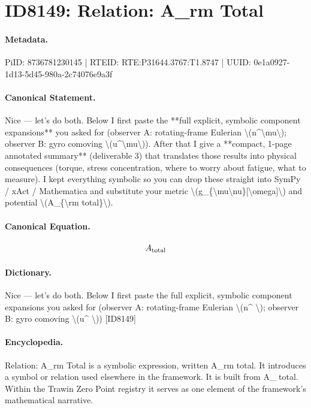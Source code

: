 \section*{ID8149: Relation: A\_rm Total}
\paragraph{Metadata.}
PiID: 8736781230145 | RTEID: RTE:P31644.3767:T1.8747 | UUID: 0e1a0927-1d13-5d45-980a-2c74076e9a3f

\paragraph{Canonical Statement.}
Nice — let’s do both. Below I first paste the **full explicit, symbolic component expansions** you asked for (observer A: rotating-frame Eulerian \textbackslash{}(n\textasciicircum{}\textbackslash{}mu\textbackslash{}); observer B: gyro comoving \textbackslash{}(u\textasciicircum{}\textbackslash{}mu\textbackslash{})). After that I give a **compact, 1-page annotated summary** (deliverable 3) that translates those results into physical consequences (torque, stress concentration, where to worry about fatigue, what to measure). I kept everything symbolic so you can drop these straight into SymPy / xAct / Mathematica and substitute your metric \textbackslash{}(g\_\{\textbackslash{}mu\textbackslash{}nu\}[\textbackslash{}omega]\textbackslash{}) and potential \textbackslash{}(A\_\{\textbackslash{}rm total\}\textbackslash{}).

\paragraph{Canonical Equation.}
\[
A_{\rm total}
\]

\paragraph{Dictionary.}
Nice — let’s do both. Below I first paste the full explicit, symbolic component expansions you asked for (observer A: rotating-frame Eulerian \textbackslash{}(n\textasciicircum{} \textbackslash{}); observer B: gyro comoving \textbackslash{}(u\textasciicircum{} \textbackslash{})) [ID8149]

\paragraph{Encyclopedia.}
Relation: A\_rm Total is a symbolic expression, written A\_rm total. It introduces a symbol or relation used elsewhere in the framework. It is built from A\_ total. Within the Trawin Zero Point registry it serves as one element of the framework's mathematical narrative.
